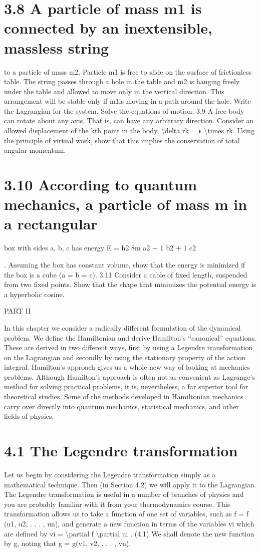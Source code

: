 \section*{3.8  A particle of mass m1 is connected by an inextensible, massless string}

to a particle of mass m2. Particle m1 is free to slide on the surface of
frictionless table. The string passes through a hole in the table and m2 is
hanging freely under the table and allowed to move only in the vertical
direction. This arrangement will be stable only if m1is moving in a path
around the hole. Write the Lagrangian for the system. Solve the equations
of motion.
3.9 A free body can rotate about any axis. That is,  can have any arbitrary
direction. Consider an allowed displacement of the kth point in the body,
\textbackslash{}delta rk = ϵ \textbackslash{}times  rk.
Using the principle of virtual work, show that this implies the conservation of total angular momentum.
\section*{3.10  According to quantum mechanics, a particle of mass m in a rectangular}

box with sides a, b, c has energy
E = h2
8m
a2 + 1
b2 + 1
c2

.
Assuming the box has constant volume, show that the energy is minimized if the box is a cube (a = b = c).
3.11 Consider a cable of fixed length, suspended from two fixed points. Show
that the shape that minimizes the potential energy is a hyperbolic cosine.

PART II

In this chapter we consider a radically different formulation of the dynamical
problem. We define the Hamiltonian and derive Hamilton's ``canonical'' equations. These are derived in two different ways, first by using a Legendre transformation on the Lagrangian and secondly by using the stationary property of
the action integral. Hamilton's approach gives us a whole new way of looking
at mechanics problems. Although Hamilton's approach is often not as convenient as Lagrange's method for solving practical problems, it is, nevertheless,
a far superior tool for theoretical studies. Some of the methods developed in
Hamiltonian mechanics carry over directly into quantum mechanics, statistical
mechanics, and other fields of physics.
\section*{4.1  The Legendre transformation}

Let us begin by considering the Legendre transformation simply as a mathematical technique. Then (in Section 4.2) we will apply it to the Lagrangian.
The Legendre transformation is useful in a number of branches of physics
and you are probably familiar with it from your thermodynamics course. This
transformation allows us to take a function of one set of variables, such as
f = f (u1, u2, . . . , un),
and generate a new function in terms of the variables vi which are defined by
vi = \textbackslash{}partial f
\textbackslash{}partial ui
.
(4.1)
We shall denote the new function by g, noting that
g = g(v1, v2, . . . , vn).